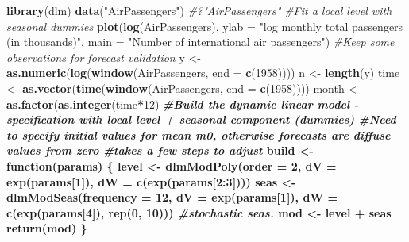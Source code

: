 \documentclass[]{book}
\newenvironment{Shaded}{\begin{snugshade}}{\end{snugshade}}
\newcommand{\CommentTok}[1]{\textcolor[rgb]{0.56,0.35,0.01}{\textit{#1}}}
\newcommand{\ControlFlowTok}[1]{\textcolor[rgb]{0.13,0.29,0.53}{\textbf{#1}}}
\newcommand{\DataTypeTok}[1]{\textcolor[rgb]{0.13,0.29,0.53}{#1}}
\newcommand{\DecValTok}[1]{\textcolor[rgb]{0.00,0.00,0.81}{#1}}
\newcommand{\KeywordTok}[1]{\textcolor[rgb]{0.13,0.29,0.53}{\textbf{#1}}}
\newcommand{\NormalTok}[1]{#1}
\newcommand{\OperatorTok}[1]{\textcolor[rgb]{0.81,0.36,0.00}{\textbf{#1}}}
\newcommand{\StringTok}[1]{\textcolor[rgb]{0.31,0.60,0.02}{#1}}
\begin{document}
\begin{Shaded}
\begin{Highlighting}[]
\KeywordTok{library}\NormalTok{(dlm)}
\KeywordTok{data}\NormalTok{(}\StringTok{"AirPassengers"}\NormalTok{)}
\CommentTok{#?"AirPassengers"}
\CommentTok{#Fit a local level with seasonal dummies}
\KeywordTok{plot}\NormalTok{(}\KeywordTok{log}\NormalTok{(AirPassengers), }\DataTypeTok{ylab =} \StringTok{"log monthly total passengers (in thousands)"}\NormalTok{, }
     \DataTypeTok{main =} \StringTok{"Number of international air passengers"}\NormalTok{)}
\CommentTok{#Keep some observations for forecast validation}
\NormalTok{y <-}\StringTok{ }\KeywordTok{as.numeric}\NormalTok{(}\KeywordTok{log}\NormalTok{(}\KeywordTok{window}\NormalTok{(AirPassengers, }\DataTypeTok{end =} \KeywordTok{c}\NormalTok{(}\DecValTok{1958}\NormalTok{))))}
\NormalTok{n <-}\StringTok{ }\KeywordTok{length}\NormalTok{(y)}
\NormalTok{time <-}\StringTok{ }\KeywordTok{as.vector}\NormalTok{(}\KeywordTok{time}\NormalTok{(}\KeywordTok{window}\NormalTok{(AirPassengers, }\DataTypeTok{end =} \KeywordTok{c}\NormalTok{(}\DecValTok{1958}\NormalTok{))))}
\NormalTok{month <-}\StringTok{ }\KeywordTok{as.factor}\NormalTok{(}\KeywordTok{as.integer}\NormalTok{(time}\OperatorTok{*}\DecValTok{12}\NormalTok{) }\OperatorTok{%%}\DecValTok{12}\NormalTok{)}
\CommentTok{#Build the dynamic linear model  - specification with local level + seasonal component (dummies)}
\CommentTok{#Need to specify initial values for mean m0, otherwise forecasts are diffuse values from zero}
\CommentTok{#takes a few steps to adjust}
\NormalTok{build <-}\StringTok{ }\ControlFlowTok{function}\NormalTok{(params) \{}
\NormalTok{  level <-}\StringTok{ }\KeywordTok{dlmModPoly}\NormalTok{(}\DataTypeTok{order =} \DecValTok{2}\NormalTok{, }\DataTypeTok{dV =} \KeywordTok{exp}\NormalTok{(params[}\DecValTok{1}\NormalTok{]), }\DataTypeTok{dW =} \KeywordTok{c}\NormalTok{(}\KeywordTok{exp}\NormalTok{(params[}\DecValTok{2}\OperatorTok{:}\DecValTok{3}\NormalTok{])))}
\NormalTok{  seas <-}\StringTok{ }\KeywordTok{dlmModSeas}\NormalTok{(}\DataTypeTok{frequency =} \DecValTok{12}\NormalTok{, }\DataTypeTok{dV =} \KeywordTok{exp}\NormalTok{(params[}\DecValTok{1}\NormalTok{]), }\DataTypeTok{dW =} \KeywordTok{c}\NormalTok{(}\KeywordTok{exp}\NormalTok{(params[}\DecValTok{4}\NormalTok{]), }\KeywordTok{rep}\NormalTok{(}\DecValTok{0}\NormalTok{, }\DecValTok{10}\NormalTok{)))  }\CommentTok{#stochastic seas.}
\NormalTok{  mod <-}\StringTok{ }\NormalTok{level }\OperatorTok{+}\StringTok{ }\NormalTok{seas }
  \KeywordTok{return}\NormalTok{(mod)}
\NormalTok{\}}
}
\end{Highlighting}
\end{Shaded}
\end{document}

